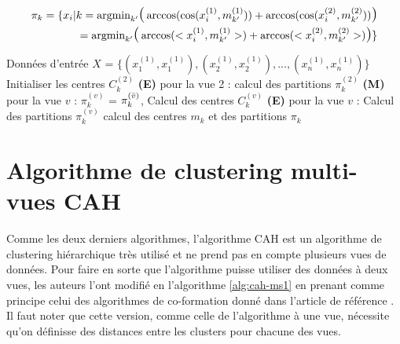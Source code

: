 \documentclass[12pt, french, latin.medieval, a4paper]{report}
\begin{document}
        \begin{equation}
            \begin{aligned}
                \pi_k = \{ 
                    x_i | 
                    k = \text{argmin}_{k'} 
                        \text{\Large(} 
                            \arccos(\cos(x_{i}^{(1)} ,m_{k'}^{(1)})) + \arccos(\cos(x_{i}^{(2)} ,m_{k'}^{(2)})) 
                        \text{\Large)} 
                    \\
                    =  \text{argmin}_{k'}\text{\Large(} \arccos(<x_{i}^{(1)} ,m_{k'}^{(1)}>) + \arccos(<x_{i}^{(2)} ,m_{k'}^{(2)}>) \text{\Large)}
                \}  
            \end{aligned}
            \label{equa:kmeans-m5} 
        \end{equation}

        \begin{algorithm}[H]
             \caption{Pseudo code de l'algorithme multi-vues KMEANS sphérique}
             \label{alg:em-mg}
             \begin{algorithmic}[1]
              \REQUIRE Données d'entrée $X$ = $\{ (x_{1}^{(1)}, x_{1}^{(1)}), (x_{2}^{(1)}, x_{2}^{(1)}), ..., (x_{n}^{(1)}, x_{n}^{(1)}) \}$
              \STATE Initialiser les centres $C_{k}^{(2)}$
              \STATE \textbf{(E)} pour la vue 2 : calcul des partitions $\pi_{k}^{(2)}$
                    \STATE \textbf{(M)} pour la vue $v$ : $\pi_{k}^{(v)}$ = $\pi_{k}^{(\Bar{v})}$, Calcul des centres $C_{k}^{(v)}$
                    \STATE \textbf{(E)} pour la vue $v$ : Calcul des partitions $\pi_{k}^{(v)}$
                \ENDFOR
              \ENDWHILE
              \STATE calcul des centres $m_k$ et des partitions $\pi_k$
             \end{algorithmic}
        \end{algorithm}


    \section{Algorithme de clustering multi-vues CAH}
        Comme les deux derniers algorithmes, l'algorithme CAH est un algorithme de clustering hiérarchique très utilisé et ne prend pas en compte plusieurs vues de données. Pour faire en sorte que l'algorithme puisse utiliser des données à deux vues, les auteurs l'ont modifié en l'algorithme \ref{alg:cah-ms1} en prenant comme principe celui des algorithmes de co-formation donné dans l'article de référence \cite{yang2018multi}. Il faut noter que cette version, comme celle de l'algorithme à une vue, nécessite qu’on définisse des distances entre les clusters pour chacune des vues.
\end{document}
